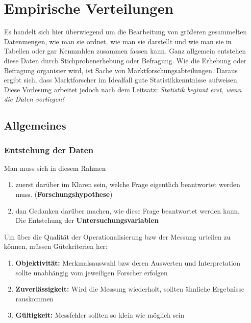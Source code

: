 \chapter{Empirische Verteilungen}
Es handelt sich hier überwiegend um die Bearbeitung von größeren gesammelten Datenmengen, wie man sie ordnet, wie man sie darstellt und wie man sie in Tabellen oder gar Kennzahlen zusammen fassen kann.
Ganz allgemein entstehen diese Daten durch Stichprobenerhebung oder Befragung. Wie die Erhebung oder Befragung organisier wird, ist Sache von Marktforschungsabteilungen.
Daraus ergibt sich, dass Marktforscher im Idealfall gute Statistikkenntnisse aufweisen. Diese Vorlesung arbeitet jedoch nach dem Leitsatz: \textit{Statistik beginnt erst, wenn die Daten vorliegen!}

\section{Allgemeines}
\subsection{Entstehung der Daten}
Man muss sich in diesem Rahmen
\begin{enumerate}
    \item zuerst darüber im Klaren sein, welche Frage eigentlich beantwortet werden muss. (\textbf{Forschungshypothese})
    \item dan Gedanken darüber machen, wie diese Frage beantwortet werden kann. Die Entstehung der \textbf{Untersuchungsvariablen}
\end{enumerate}
Um über die Qualität der Operationalisierung bzw der Messung urteilen zu können, müssen Gütekriterien her:
\begin{enumerate}
    \item \textbf{Objektivität:} Merkmalsauswahl bzw deren Auswerten und Interpretation sollte unabhängig vom jeweiligen Forscher erfolgen
    \item \textbf{Zuverlässigkeit:} Wird die Messung wiederholt, sollten ähnliche Ergebnisse rauskommen
    \item \textbf{Gültigkeit:} Messfehler sollten so klein wie möglich sein
\end{enumerate}

